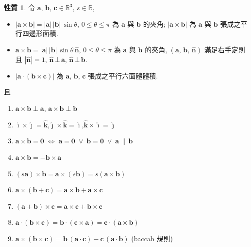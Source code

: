 \documentclass[12pt]{extarticle}
\newcommand{\ifff}{\;\Longleftrightarrow\;}
\theoremstyle{definition}
\newtheorem*{prp}{性質}
\newcommand{\va}{\mathbf{a}}
\newcommand{\vb}{\mathbf{b}}
\newcommand{\vc}{\mathbf{c}}
\newcommand{\vZero}{\mathbf{0}}
\newcommand{\hi}{\widehat{\pmb{\imath}}}
\newcommand{\hj}{\widehat{\pmb{\jmath}}}
\newcommand{\hk}{\widehat{\mathbf{k}}}
\newcommand{\hn}{\widehat{\mathbf{n}}}
\begin{document}
\begin{prp} 令 $\va$, $\vb$, $\vc\in\mathbb{R}^3$, $s\in\mathbb{R}$,
  \begin{itemize}\setlength{\itemsep}{0pt}
    \item $|\va\times\vb| = |\va|\,|\vb|\,\sin\theta$, $0\leqslant\theta\leqslant\pi$ 為 $\va$ 與 $\vb$ 的夾角; $|\va\times\vb|$ 為 $\va$ 與 $\vb$ 張成之平行四邊形面積. 
    \item $\va\times\vb = |\va|\,|\vb|\,\sin\theta\,\hn$, $0\leqslant\theta\leqslant\pi$ 為 $\va$ 與 $\vb$ 的夾角, $(\va,\,\vb,\,\hn)$ 滿足右手定則且 $|\hn| = 1$, $\hn\,\bot\,\va$, $\hn\,\bot\,\vb$.  
    \item $|\va\cdot(\vb\times\vc)|$ 為 $\va$, $\vb$, $\vc$ 張成之平行六面體體積. 
  \end{itemize}
  且
  \setlength{\columnsep}{-20mm}
  \begin{multicols}{2}
    \begin{enumerate}\setlength{\itemsep}{0pt}
      \item $\va\times\vb\;\bot\;\va$, $\va\times\vb\;\bot\;\vb$ 
      \item $\hi\times\hj = \hk$,\;$\hj\times\hk = \hi$,\;$\hk\times\hi = \hj$
      \item $\va\times\vb = \vZero\ifff \va=\vZero\;\vee\;\vb = \vZero\;\vee\;\va\,\parallel\,\vb$
      \item $\va\times\vb = -\vb\times\va$
      \item $(s\va)\times\vb = \va\times(s\vb) = s(\va\times\vb)$
      \item $\va\times(\vb + \vc) = \va\times\vb + \va\times\vc$
      \item $(\va + \vb)\times\vc = \va\times\vc + \vb\times\vc$
      \item $\va\cdot(\vb\times\vc) = \vb\cdot(\vc\times\va) = \vc\cdot(\va\times\vb)$
      \item $\va\times(\vb\times\vc) = \vb\,(\va\cdot\vc) - \vc\,(\va\cdot\vb)$ (baccab 規則)  
    \end{enumerate}
  \end{multicols}
\end{prp}
\vspace{-3mm}
\end{document}
